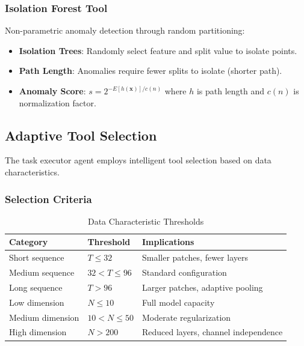 \subsubsection{Isolation Forest Tool}

Non-parametric anomaly detection through random partitioning:

\begin{itemize}[leftmargin=*, itemsep=1pt]
    \item \textbf{Isolation Trees}: Randomly select feature and split value to isolate points.
    \item \textbf{Path Length}: Anomalies require fewer splits to isolate (shorter path).
    \item \textbf{Anomaly Score}: $s = 2^{-E[h(\mathbf{x})]/c(n)}$ where $h$ is path length and $c(n)$ is normalization factor.
\end{itemize}

\subsection{Adaptive Tool Selection}
\label{appx:adaptive_selection}

The task executor agent employs intelligent tool selection based on data characteristics.

\subsubsection{Selection Criteria}

\begin{table}[h]
\centering
\caption{Data Characteristic Thresholds}
\label{tab:selection_thresholds}
\begin{tabular}{lll}
\toprule
\textbf{Category} & \textbf{Threshold} & \textbf{Implications} \\
\midrule
Short sequence & $T \leq 32$ & Smaller patches, fewer layers \\
Medium sequence & $32 < T \leq 96$ & Standard configuration \\
Long sequence & $T > 96$ & Larger patches, adaptive pooling \\
\midrule
Low dimension & $N \leq 10$ & Full model capacity \\
Medium dimension & $10 < N \leq 50$ & Moderate regularization \\
High dimension & $N > 200$ & Reduced layers, channel independence \\
\bottomrule
\end{tabular}
\end{table}

